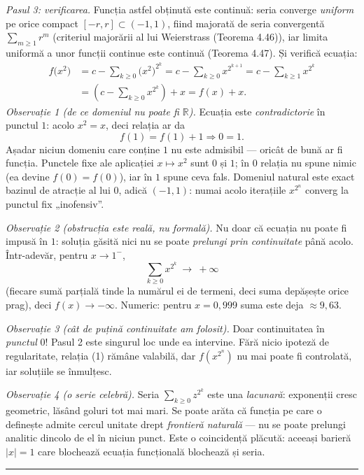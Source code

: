 \emph{Pasul 3: verificarea.} Funcția astfel obținută este continuă: seria converge \emph{uniform} pe orice compact $[-r,r]\subset(-1,1)$, fiind majorată de seria convergentă $\sum_{m\ge1}r^{m}$ (criteriul majorării al lui Weierstrass (Teorema 4.46)), iar limita uniformă a unor funcții continue este continuă (Teorema 4.47). Și verifică ecuația:
\[ \begin{aligned} f\bigl(x^{2}\bigr)&=c-\sum_{k\ge0}\bigl(x^{2}\bigr)^{2^{k}}=c-\sum_{k\ge0}x^{2^{k+1}}=c-\sum_{k\ge1}x^{2^{k}}\\ &=\left(c-\sum_{k\ge0}x^{2^{k}}\right)+x=f(x)+x . \end{aligned} \]
\emph{Observație 1 (de ce domeniul nu poate fi $\mathbb{R}$).} Ecuația este \emph{contradictorie} în punctul $1$: acolo $x^{2}=x$, deci relația ar da
\[ f(1)=f(1)+1 \Longrightarrow 0=1 . \]
Așadar niciun domeniu care conține $1$ nu este admisibil --- oricât de bună ar fi funcția. Punctele fixe ale aplicației $x\mapsto x^{2}$ sunt $0$ și $1$; în $0$ relația nu spune nimic (ea devine $f(0)=f(0)$), iar în $1$ spune ceva fals. Domeniul natural este exact bazinul de atracție al lui $0$, adică $(-1,1)$: numai acolo iterațiile $x^{2^{n}}$ converg la punctul fix „inofensiv''.

\emph{Observație 2 (obstrucția este reală, nu formală).} Nu doar că ecuația nu poate fi impusă în $1$: soluția găsită nici nu se poate \emph{prelungi prin continuitate} până acolo. Într-adevăr, pentru $x\to1^{-}$,
\[ \sum_{k\ge0}x^{2^{k}}\ \longrightarrow\ +\infty \]
(fiecare sumă parțială tinde la numărul ei de termeni, deci suma depășește orice prag), deci $f(x)\to-\infty$. Numeric: pentru $x=0{,}999$ suma este deja $\approx9{,}63$.

\emph{Observație 3 (cât de puțină continuitate am folosit).} Doar continuitatea în \emph{punctul} $0$! Pasul 2 este singurul loc unde ea intervine. Fără nicio ipoteză de regularitate, relația (1) rămâne valabilă, dar $f(x^{2^{n}})$ nu mai poate fi controlată, iar soluțiile se înmulțesc.

\emph{Observație 4 (o serie celebră).} Seria $\sum_{k\ge0}z^{2^{k}}$ este una \emph{lacunară}: exponenții cresc geometric, lăsând goluri tot mai mari. Se poate arăta că funcția pe care o definește admite cercul unitate drept \emph{frontieră naturală} --- nu se poate prelungi analitic dincolo de el în niciun punct. Este o coincidență plăcută: aceeași barieră $|x|=1$ care blochează ecuația funcțională blochează și seria.
\vspace{1mm}\hrule

